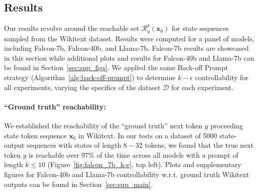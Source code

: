 \documentclass{article} %
\begin{document}



\subsection{Results}
\label{sec:results}


Our results revolve around the reachable set $\mathcal R_y^k(\mathbf x_0)$ for state sequences sampled from the Wikitext dataset. 
Results were computed for a panel of models, including Falcon-7b, Falcon-40b, and Llama-7b. 
Falcon-7b results are showcased in this section while additional plots and results for Falcon-40b and Llama-7b can be found in Section~\ref{sec:sup_figs}.
We applied the same Back-off Prompt strategy (Algorithm~\ref{alg:back-off-prompt}) to determine $k-\epsilon$ controllability for all experiments, varying the specifics of the dataset $\mathcal D$ for each experiment.


\paragraph{``Ground truth'' reachability: } We established the reachability of the ``ground truth'' next token $y$ proceeding state token sequence $\mathbf x_0$ in Wikitext. 
In our tests on a dataset of 5000 state-output sequences with states of length $8-32$ tokens, we found that the true next token $y$ is reachable over 97\% of the time across all models with a prompt of length $k\leq 10$ (Figure~\ref{fig:falcon_7b_k-e}, top left). Plots and supplementary figures for Falcon-40b and Llama-7b controllability w.r.t. ground truth Wikitext outputs can be found in Section~\ref{sec:sup_main}.
\end{document}

